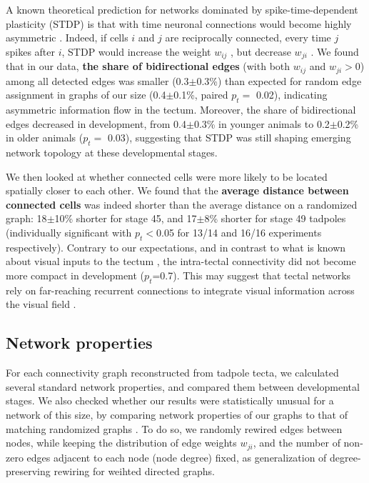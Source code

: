 \documentclass{article}
\begin{document}
A known theoretical prediction for networks dominated by spike-time-dependent plasticity (STDP) is that with time neuronal connections would become highly asymmetric \citep{pratt2008recurrent, richards2010stdp}. Indeed, if cells $i$ and $j$ are reciprocally connected, every time $j$ spikes after $i$, STDP would increase the weight $w_{ij}$ , but decrease $w_{ji}$ \citep{abbott1996ltpsequence, fiete2010chains}. We found that in our data, \textbf{the share of bidirectional edges} (with both $w_{ij}$ and $w_{ji}>$0) among all detected edges was smaller (0.3$\pm$0.3\%) than expected for random edge assignment in graphs of our size (0.4$\pm$0.1\%, paired $p_t=$ 0.02), indicating asymmetric information flow in the tectum. Moreover, the share of bidirectional edges decreased in development, from 0.4$\pm$0.3\% in younger animals to 0.2$\pm$0.2\% in older animals ($p_t=$ 0.03), suggesting that STDP was still shaping emerging network topology at these developmental stages.

We then looked at whether connected cells were more likely to be located spatially closer to each other. We found that the \textbf{average distance between connected cells} was indeed shorter than the average distance on a randomized graph: 18$\pm$10\% shorter for stage 45, and 17$\pm$8\% shorter for stage 49 tadpoles (individually significant with $p_t<$0.05 for 13/14 and 16/16 experiments respectively). Contrary to our expectations, and in contrast to what is known about visual inputs to the tectum \citep{tao2005refinement}, the intra-tectal connectivity did not become more compact in development ($p_t$=0.7). This may suggest that tectal networks rely on far-reaching recurrent connections to integrate visual information across the visual field \citep{baginskas2009recurrent, liu2016jumbo, jang2016}.

\subsection*{Network properties}

For each connectivity graph reconstructed from tadpole tecta, we calculated several standard network properties, and compared them between developmental stages. We also checked whether our results were statistically unusual for a network of this size, by comparing network properties of our graphs to that of matching randomized graphs \citep{ansmann2012surrogate}. To do so, we randomly rewired edges between nodes, while keeping the distribution of edge weights $w_{ji}$, and the number of non-zero edges adjacent to each node (node degree) fixed, as  generalization of degree-preserving rewiring \citep{maslov2002} for weihted directed graphs. 
\end{document}
